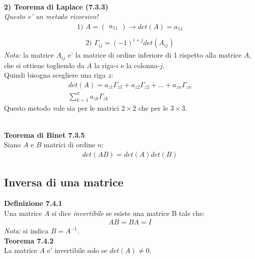 \documentclass{article}
\begin{document}
\vspace{1em}
\textbf{\\2) Teorema di Laplace (7.3.3)}
\textit{\\Questo e' un metodo ricorsivo!}
\begin{align*}
  \text{1) }A=\begin{pmatrix}
    a_{11}
  \end{pmatrix} \to det(A)=a_{11} \\
\end{align*}
\begin{align*}
  \text{2) } \Gamma_{ij}=(-1)^{i+j}det(A_{ij})
\end{align*}
\textit{Nota: }la matrice $A_{ij}$ e' la matrice di ordine inferiore di 1 rispetto alla matrice $A$, che si ottiene togliendo da $A$ la riga-$i$ e la colonna-$j$.
\vspace{4px}
\\Quindi bisogna scegliere una riga $z$:
\begin{align*}
  det(A)=a_{z1}\Gamma_{z1}+a_{z2}\Gamma_{z2}+\dots+a_{zn}\Gamma_{zn} \\
  \sum_{k=1}^{n} a_{zk}\Gamma_{zk}
\end{align*}
Questo metodo vale sia per le matrici $2\times 2$ che per le $3\times 3$.

\textbf{\\Teorema di Binet 7.3.5}
\\Siano $A$ e $B$ matrici di ordine $n$:
\begin{align*}
  det(AB)=det(A)det(B)
\end{align*}

\vspace{4em}
\subsection{Inversa di una matrice}
\textbf{Definizione 7.4.1}
\\Una matrice $A$ si dice \textit{invertibile} se esiste una matrice B tale che:
\begin{align*}
  AB=BA=I
\end{align*}
\textit{Nota:} si indica $B=A^{-1}$.
\vspace{1em}
\textbf{\\Teorema 7.4.2}
\\La matrice $A$ e' invertibile solo se $det(A)\neq0$.

\vspace{3em}
\end{document}

